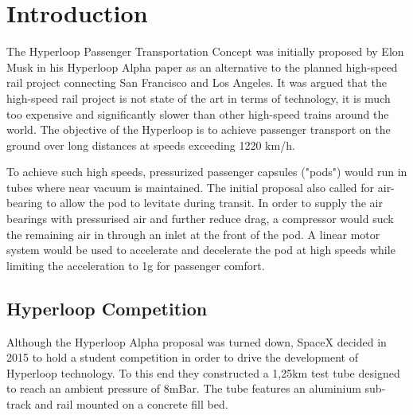 
\chapter{Introduction}

The Hyperloop Passenger Transportation Concept was initially proposed by Elon Musk in his Hyperloop Alpha paper\cite{HyperloopAlpha} as an alternative to the planned high-speed rail project connecting San Francisco and Los Angeles. It was argued that the high-speed rail project is not state of the art in terms of technology, it is much too expensive and significantly slower than other high-speed trains around the world. The objective of the Hyperloop is to achieve passenger transport on the ground over long distances at speeds exceeding 1220 km/h.

To achieve such high speeds, pressurized passenger capsules ("pods") would run in tubes where near vacuum is maintained. The initial proposal also called for air-bearing to allow the pod to levitate during transit. In order to supply the air bearings with pressurised air and further reduce drag, a compressor would suck the remaining air in through an inlet at the front of the pod. A linear motor system would be used to accelerate and decelerate the pod at high speeds while limiting the acceleration to 1g for passenger comfort.

\section{Hyperloop Competition}

Although the Hyperloop Alpha proposal was turned down, SpaceX decided in 2015 to hold a student competition\cite{HyperloopCompetiton} in order to drive the development of Hyperloop technology. To this end they constructed a 1,25km test tube designed to reach an ambient pressure of 8mBar. The tube features an aluminium sub-track and rail mounted on a concrete fill bed.

